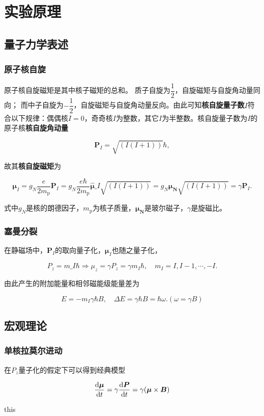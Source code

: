 \section{实验原理}\label{ux5b9eux9a8cux539fux7406}

\subsection{量子力学表述}\label{ux91cfux5b50ux529bux5b66ux8868ux8ff0}

\subsubsection{原子核自旋}\label{ux539fux5b50ux6838ux81eaux65cb}

原子核自旋磁矩是其中核子磁矩的总和。
质子自旋为\(\dfrac{1}{2}\)，自旋磁矩与自旋角动量同向；
而中子自旋为\(-\dfrac{1}{2}\)，自旋磁矩与自旋角动量反向。由此可知\textbf{核自旋量子数}\(I\)符合以下规律：偶偶核\(I=0\)，奇奇核\(I\)为整数，其它\(I\)为半整数。核自旋量子数为\(I\)的原子核\textbf{核自旋角动量}

\[
    \boldsymbol{P}_{I} = \sqrt{(I(I+1))}\hbar,
\]

故其\textbf{核自旋磁矩}为

\[
    \boldsymbol{\mu}_{I} = g_N\dfrac{e}{2m_{\text{p}}}\boldsymbol{P}_{I} = g_N\dfrac{e\hbar}{2m_{\text{p}}}\hat{\boldsymbol{\mu}}\_I\sqrt{(I(I+1))} = g_N\boldsymbol{\mu_N}\sqrt{(I(I+1))} = \gamma \boldsymbol{P}_{I}.
\]

式中\(g_N\)是核的朗德因子，\(m_{\text{p}}\)为核子质量，\(\boldsymbol{\mu_N}\)是玻尔磁子，\(\gamma\)是旋磁比。

\subsubsection{塞曼分裂}\label{ux585eux66fcux5206ux88c2}

在静磁场中，\(\boldsymbol{P}_I\)的取向量子化，\(\boldsymbol{\mu}_I\)也随之量子化，

\[
    P_z = m\_I\hbar\Rightarrow \mu_z = \gamma P_z=\gamma m_I\hbar,\quad m_I = I,I-1,\cdots,-I.
\]

由此产生的附加能量和相邻磁能级能量差为

\[
    E = -m_I\gamma\hbar B,\quad \Delta E = \gamma\hbar B = \hbar \omega. (\omega = \gamma B)
\]

\subsection{宏观理论}\label{ux5b8fux89c2ux7406ux8bba}

\subsubsection{单核拉莫尔进动}\label{ux5355ux6838ux62c9ux83abux5c14ux8fdbux52a8}

在\(P_z\)量子化的假定下可以得到经典模型

\[
    \dfrac{{\rm d}\boldsymbol{\mu}}{{\rm d}t} = \gamma\dfrac{{\rm d}\boldsymbol{P}}{{\rm d}t} = \gamma (\boldsymbol{\mu}\times \boldsymbol{B})
\]

this
